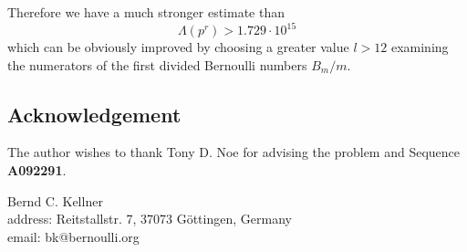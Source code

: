 \documentclass[12pt,english]{article}
\begin{document}
Therefore we have a much stronger estimate than 
\[
   \Lambda(p^r) > 1.729 \cdot 10^{15}
\]
which can be obviously improved by choosing a greater value $l > 12$ examining the
numerators of the first divided Bernoulli numbers $B_m/m$.

\subsection*{Acknowledgement}
The author wishes to thank Tony D. Noe for advising the problem and Sequence \textbf{A092291}.
\bigskip

Bernd C. Kellner \\
{\small address: Reitstallstr. 7, 37073 G\"ottingen, Germany \\
email: bk@bernoulli.org}



\end{document}
